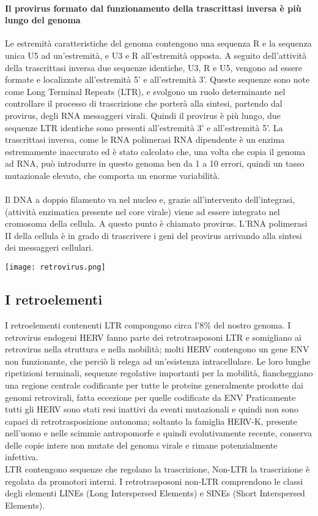 \documentclass{article}
\begin{document}
\paragraph{Il provirus formato dal funzionamento della trascrittasi inversa è più lungo del genoma}
Le estremità caratteristiche del genoma contengono una sequenza R e la sequenza unica U5 ad un'estremità, e
U3 e R all'estremità opposta.
A seguito dell'attività della trascrittasi inversa due sequenze identiche, U3, R e U5, vengono ad essere formate e
localizzate all'estremità 5' e all'estremità 3'.
Queste sequenze sono note come Long Terminal Repeats (LTR), e svolgono un ruolo determinante nel
controllare il processo di trascrizione che porterà alla sintesi, partendo dal provirus, degli RNA messaggeri virali.
Quindi il provirus è più lungo, due sequenze LTR identiche sono presenti all'estremità 3' e all'estremità 5'.
La trascrittasi inversa, come le RNA polimerasi RNA dipendente è un enzima estremamente inaccurato ed è
stato calcolato che, una volta che copia il genoma ad RNA, può introdurre in questo genoma ben da 1 a 10
errori, quindi un tasso mutazionale elevato, che comporta un enorme variabilità.
\paragraph{}
Il DNA a doppio filamento va nel nucleo e, grazie all'intervento
dell'integrasi, (attività enzimatica presente nel core virale) viene ad
essere integrato nel cromosoma della cellula. A questo punto è
chiamato provirus.
L'RNA polimerasi II della cellula è in grado di trascrivere i
geni del provirus arrivando alla sintesi dei messaggeri
cellulari.
\begin{center}
    \texttt{[image: retrovirus.png]}
\end{center}
\subsection{I retroelementi}
I retroelementi contenenti LTR compongono circa l'8$\%$ del nostro genoma.
I retrovirus endogeni HERV fanno parte dei retrotrasposoni LTR e somigliano ai retrovirus
nella struttura e nella mobilità; molti HERV contengono un gene ENV non funzionante, che
perciò li relega ad un'esistenza intracellulare.
Le loro lunghe ripetizioni terminali, sequenze regolative importanti per la mobilità, fiancheggiano
una regione centrale codificante per tutte le proteine generalmente prodotte dai genomi
retrovirali, fatta eccezione per quelle codificate da ENV
Praticamente tutti gli HERV sono stati resi inattivi da eventi mutazionali e quindi non sono
capaci di retrotrasposizione autonoma;
soltanto la famiglia HERV-K, presente nell'uomo e nelle scimmie antropomorfe e quindi
evolutivamente recente, conserva delle copie intere non mutate del genoma virale e rimane
potenzialmente infettiva.\\
LTR contengono sequenze che regolano la trascrizione, Non-LTR la trascrizione è regolata da promotori interni.
I retrotrasposoni non-LTR comprendono le classi degli
elementi LINEs (Long Interspersed Elements) e SINEs
(Short Interspersed Elements).
\end{document}
